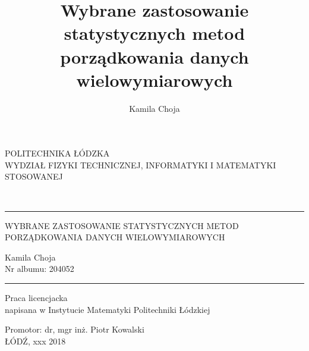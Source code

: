 \documentclass[12pt,a4paper]{report}
\author{Kamila Choja}
\title{Wybrane zastosowanie statystycznych metod porządkowania danych wielowymiarowych}
\begin{document}
\begin{titlepage}
\begin{center}
        \vspace*{1cm}
        {\large POLITECHNIKA ŁÓDZKA}\\
       \vspace*{1cm}
        {\large WYDZIAŁ FIZYKI TECHNICZNEJ, INFORMATYKI I MATEMATYKI STOSOWANEJ}\\
        \vspace*{2cm}
    \end{center}        
        
\\
\vspace*{0.3cm}
\hspace*{0.3cm}
  
\begin{center}
\rule{\textwidth}{0.5pt}

\vspace*{0.5cm}
   
{\large WYBRANE ZASTOSOWANIE STATYSTYCZNYCH METOD\\ }
{\large PORZĄDKOWANIA DANYCH WIELOWYMIAROWYCH\\}
\vspace*{1cm}


\begin{flushright}
Kamila Choja\\
Nr albumu: 204052 
 \end{flushright}
\rule{\textwidth}{0.5pt}

Praca licencjacka\\
napisana w Instytucie Matematyki Politechniki Łódzkiej\\

\vspace*{2cm}

Promotor: dr, mgr inż. Piotr Kowalski\\
\vfill
ŁÓDŹ, xxx 2018


     \end{center}   
\end{titlepage}

\tableofcontents
\end{document}
